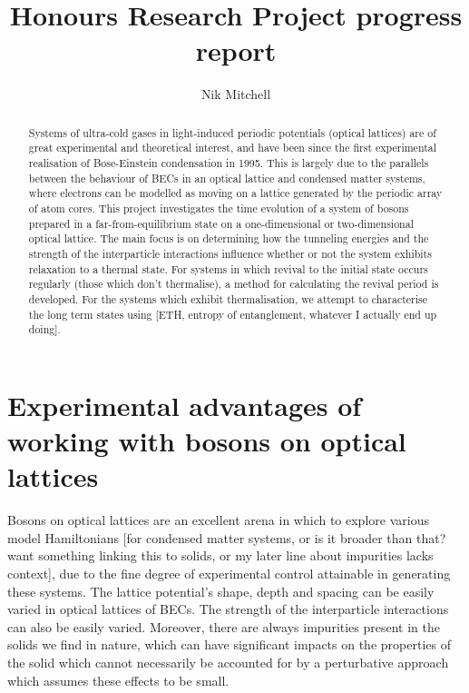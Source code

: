 \documentclass[a4paper,10pt]{article}
\title{Honours Research Project progress report}
\author{Nik Mitchell}
\begin{document}
\maketitle

\begin{abstract}

Systems of ultra-cold gases in light-induced periodic potentials (optical lattices) are of great experimental and theoretical interest, and have been since the first experimental 
realisation of Bose-Einstein condensation in 1995. 
This is largely due to the parallels between the behaviour of BECs in an optical lattice and condensed matter systems, where 
electrons can be modelled as moving on a lattice generated by the periodic array of atom cores\cite{Bloch2012}. This project 
investigates the time evolution of a system of bosons prepared in a far-from-equilibrium state on a one-dimensional or two-dimensional
optical lattice. The main focus is on determining how the tunneling energies and the strength of the interparticle interactions influence
whether or not the system exhibits relaxation to a thermal state. For systems in which revival to the initial state occurs regularly (those which don't thermalise), 
a method for calculating the revival period is developed. For the systems which exhibit thermalisation, we attempt to characterise the long term
states using [ETH, entropy of entanglement, whatever I actually end up doing].




\end{abstract}
\newpage
\section{Experimental advantages of working with bosons on optical lattices}
Bosons on optical lattices are an excellent arena in which to explore various model Hamiltonians [for condensed matter systems, or is it broader than that?
want something linking this to solids, or my later line about impurities lacks context], due to the 
fine degree of experimental control attainable in generating these systems.
The lattice potential's shape, depth and spacing can be easily varied in optical lattices of BECs\cite{Morsch2006}. 
The strength of the interparticle interactions can also be easily varied. 
Moreover, there are always impurities present in the solids we find in nature,
which can have significant impacts on the properties of the solid which cannot necessarily be accounted for by a perturbative approach which assumes these effects 
to be small. %
\end{document}
